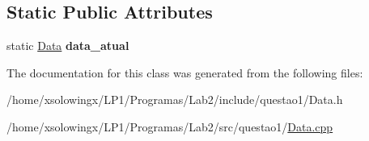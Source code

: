\subsection*{Static Public Attributes}
\begin{DoxyCompactItemize}
\item 
\mbox{\label{classData_a0a019f774fb2101b122b12f8167dff46}} 
static \hyperlink{classData}{Data} {\bfseries data\+\_\+atual}
\end{DoxyCompactItemize}


The documentation for this class was generated from the following files\+:\begin{DoxyCompactItemize}
\item 
/home/xsolowingx/\+L\+P1/\+Programas/\+Lab2/include/questao1/Data.\+h\item 
/home/xsolowingx/\+L\+P1/\+Programas/\+Lab2/src/questao1/\hyperlink{Data_8cpp}{Data.\+cpp}\end{DoxyCompactItemize}
